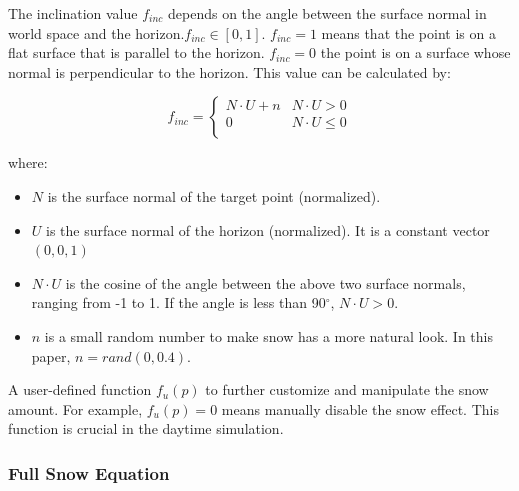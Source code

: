 \documentclass{article}
\begin{document}
The inclination value \( f_{inc} \) depends on the angle between the surface normal in world space and the
horizon.\( f_{inc} \in [0, 1] \). \( f_{inc}=1 \) means that the point is on a flat surface that is parallel 
to the horizon. \( f_{inc}=0 \) the point is on a surface whose normal is perpendicular to the horizon. This
value can be calculated by:

\[
  f_{inc}=
  \left\{
    \begin{array}{ll}
      N \cdot U + n & N \cdot U > 0 \\
      0 & N \cdot U \leq 0 \\
    \end{array} 
  \right. 
\]

where:
\begin{itemize}
  \item \( N \) is the surface normal of the target point (normalized).
  \item \( U \) is the surface normal of the horizon (normalized). It is a constant vector \((0, 0, 1)\)
  \item \( N \cdot U \) is the cosine of the angle between the above two surface normals, ranging from 
  -1 to 1. If the angle is less than 90$^{\circ}$, \( N \cdot U > 0\).
  \item \( n \) is a small random number to make snow has a more natural look. In this paper, 
  \(n = rand(0, 0.4)\).
\end{itemize}

A user-defined function \( f_{u}(p) \) to further customize and manipulate the snow amount. For example, 
\( f_{u}(p)=0 \) means manually disable the snow effect. This function is crucial in the daytime simulation.


%



\subsubsection {Full Snow Equation}
\end{document}
